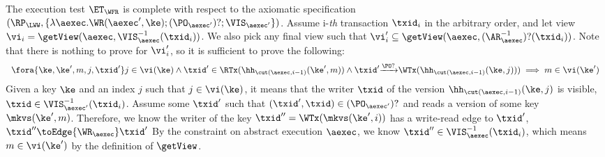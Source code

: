 The execution test $\ET_\WFR$ is complete with respect to the axiomatic specification 
\( (\RP_{\LWW}, \{\lambda \aexec. \WR(\aexec', \ke) ; (\PO_{\aexec'})? ; \VIS_{\aexec'} \})\).
Assume i-\emph{th} transaction \( \txid_i \) in the arbitrary order,
and let view \( \vi_{i} = \getView(\aexec, \VIS^{-1}_{\aexec}(\txid_{i}) ) \).
We also pick any final view such that \( \vi'_{i} \subseteq \getView(\aexec, (\AR^{-1}_{\aexec})?(\txid_{i}) ) \).
Note that there is nothing to prove for \( \vi'_i \),
so it is sufficient to prove the following:
\[
    \begin{array}{l}
    \fora{\ke, \ke', m, j, \txid'} j \in \vi(\ke)
    \land \txid' \in \RTx(\hh_{\cut(\aexec, i-1)}(\ke', m)) \land \txid' {\xrightarrow{\PO?}} \WTx(\hh_{\cut(\aexec, i-1)}(\ke, j)) ) 
    \implies m \in \vi(\ke')
    \end{array}
\]
Given a key \( \ke \) and an index \( j \) such that \( j \in \vi(\ke) \), 
it means that the writer \( \txid \) of the version \( \hh_{\cut(\aexec, i-1)}(\ke, j) \) is visible, \ie \( \txid \in \VIS_{\aexec'}^{-1}(\txid_i) \).
Assume some \( \txid' \) such that \( (\txid', \txid) \in (\PO_{\aexec'})? \) and reads a version of some key \( \mkvs(\ke',m) \).
Therefore, we know the writer of the key \( \txid'' = \WTx(\mkvs(\ke',i)) \) has a write-read edge to \( \txid' \), \ie \( \txid'' \toEdge{\WR_\aexec} \txid'\) 
By the constraint on abstract execution \( \aexec \), we know \( \txid'' \in \VIS^{-1}_{\aexec}(\txid_{i}) \),
which means \( m \in \vi(\ke')\) by the definition of \( \getView \).
